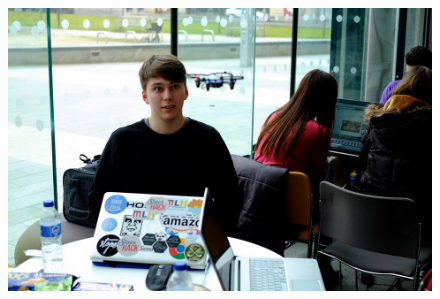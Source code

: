 
\begin{figure}[h!]

    \includegraphics[width=1\linewidth]{figs/filler}

    \caption{}

    \label{fig:software}

\end{figure}


